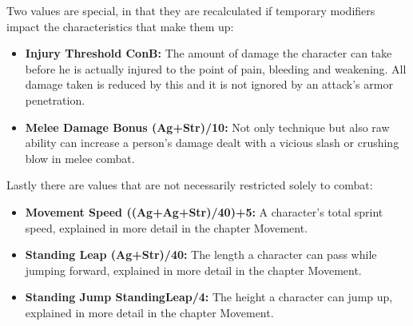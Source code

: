 \documentclass[12pt,a4paper,openany]{book}
\begin{document}
	Two values are special, in that they are recalculated if temporary modifiers impact the characteristics that make them up:
	\begin{itemize}
		\setlength\itemsep{-8mm}
		\item \textbf{Injury Threshold \textlangle ConB\textrangle:} The amount of damage the character can take before he is actually injured to the point of pain, bleeding and weakening. All damage taken is reduced by this and it is not ignored by an attack’s armor penetration.
		\item \textbf{Melee Damage Bonus \textlangle(Ag+Str)/10\textrangle:} Not only technique but also raw ability can increase a person’s damage dealt with a vicious slash or crushing blow in melee combat.
	\end{itemize}

	Lastly there are values that are not necessarily restricted solely to combat:
	\begin{itemize}
		\setlength\itemsep{-8mm}
		\item \textbf{Movement Speed \textlangle((Ag+Ag+Str)/40)+5\textrangle:} A character’s total sprint speed, explained in more detail in the chapter Movement.
		\item \textbf{Standing Leap \textlangle(Ag+Str)/40\textrangle:} The length a character can pass while jumping forward, explained in more detail in the chapter Movement.
		\item \textbf{Standing Jump \textlangle StandingLeap/4\textrangle:} The height a character can jump up, explained in more detail in the chapter Movement.
	\end{itemize}
\end{document}
